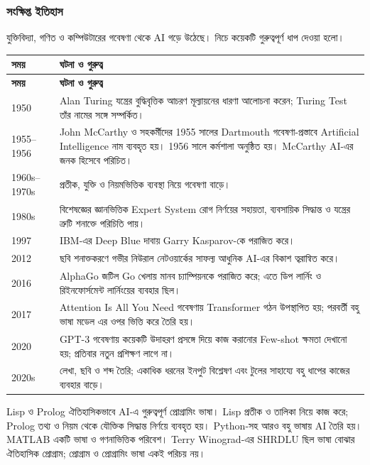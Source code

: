 \begin{topicbody}
\subsubsection{সংক্ষিপ্ত ইতিহাস}
যুক্তিবিদ্যা, গণিত ও কম্পিউটারের গবেষণা থেকে AI গড়ে উঠেছে। নিচে কয়েকটি গুরুত্বপূর্ণ ধাপ দেওয়া হলো।
\begin{compacttable}
\begin{longtable}{|p{}|p{}|}
\hline\textbf{সময়} & \textbf{ঘটনা ও গুরুত্ব}\\\hline\endfirsthead
\hline\textbf{সময়} & \textbf{ঘটনা ও গুরুত্ব}\\\hline\endhead
1950 & Alan Turing যন্ত্রের বুদ্ধিবৃত্তিক আচরণ মূল্যায়নের ধারণা আলোচনা করেন; Turing Test তাঁর নামের সঙ্গে সম্পর্কিত।\\\hline
1955--1956 & John McCarthy ও সহকর্মীদের 1955 সালের Dartmouth গবেষণা-প্রস্তাবে Artificial Intelligence নাম ব্যবহৃত হয়। 1956 সালে কর্মশালা অনুষ্ঠিত হয়। McCarthy AI-এর জনক হিসেবে পরিচিত।\\\hline
1960s--1970s & প্রতীক, যুক্তি ও নিয়মভিত্তিক ব্যবস্থা নিয়ে গবেষণা বাড়ে।\\\hline
1980s & বিশেষজ্ঞের জ্ঞানভিত্তিক Expert System রোগ নির্ণয়ের সহায়তা, ব্যবসায়িক সিদ্ধান্ত ও যন্ত্রের ত্রুটি শনাক্তে পরিচিতি পায়।\\\hline
1997 & IBM-এর Deep Blue দাবায় Garry Kasparov-কে পরাজিত করে।\\\hline
2012 & ছবি শনাক্তকরণে গভীর নিউরাল নেটওয়ার্কের সাফল্য আধুনিক AI-এর বিকাশ ত্বরান্বিত করে।\\\hline
2016 & AlphaGo জটিল Go খেলায় মানব চ্যাম্পিয়নকে পরাজিত করে; এতে ডিপ লার্নিং ও রিইনফোর্সমেন্ট লার্নিংয়ের ব্যবহার ছিল।\\\hline
2017 & Attention Is All You Need গবেষণায় Transformer গঠন উপস্থাপিত হয়; পরবর্তী বহু ভাষা মডেল এর ওপর ভিত্তি করে তৈরি হয়।\\\hline
2020 & GPT-3 গবেষণায় কয়েকটি উদাহরণ প্রসঙ্গে দিয়ে কাজ করানোর Few-shot ক্ষমতা দেখানো হয়; প্রতিবার নতুন প্রশিক্ষণ লাগে না।\\\hline
2020s & লেখা, ছবি ও শব্দ তৈরি; একাধিক ধরনের ইনপুট বিশ্লেষণ এবং টুলের সাহায্যে বহু ধাপের কাজের ব্যবহার বাড়ে।\\\hline
\end{longtable}
\end{compacttable}
Lisp ও Prolog ঐতিহাসিকভাবে AI-এ গুরুত্বপূর্ণ প্রোগ্রামিং ভাষা। Lisp প্রতীক ও তালিকা নিয়ে কাজ করে; Prolog তথ্য ও নিয়ম থেকে যৌক্তিক সিদ্ধান্ত নির্ণয়ে ব্যবহৃত হয়। Python-সহ আরও বহু ভাষায় AI তৈরি হয়। MATLAB একটি ভাষা ও গণনাভিত্তিক পরিবেশ। Terry Winograd-এর SHRDLU ছিল ভাষা বোঝার ঐতিহাসিক প্রোগ্রাম; প্রোগ্রাম ও প্রোগ্রামিং ভাষা একই পরিচয় নয়।

\end{topicbody}
